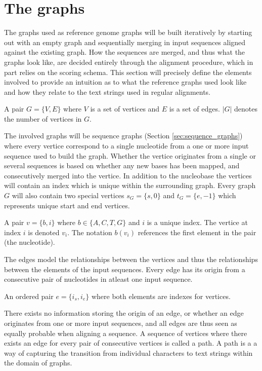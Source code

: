 \documentclass[thesis.tex]{subfiles}
\begin{document}
{\section{The graphs}
The graphs used as reference genome graphs will be built iteratively by starting out with an empty graph and sequentially merging in input sequences aligned against the existing graph. How the sequences are merged, and thus what the graphs look like, are decided entirely through the alignment procedure, which in part relies on the scoring schema. This section will precisely define the elements involved to provide an intuition as to what the reference graphs used look like and how they relate to the text strings used in regular alignments. 
\begin{defn}
  A pair $G=\{V,E\}$ where $V$ is a set of vertices and $E$ is a set of edges. $|G|$ denotes the number of vertices in $G$.
\end{defn}
The involved graphs will be sequence graphs (Section \ref{sec:sequence_graphs}) where every vertice correspond to a single nucleotide from a one or more input sequence used to build the graph. Whether the vertice originates from a single or several sequences is based on whether any new bases has been mapped, and consecutively merged into the vertice. In addition to the nucleobase the vertices will contain an index which is unique within the surrounding graph. Every graph $G$ will also contain two special vertices $s_G=\{s, 0\}$ and $t_G=\{e, -1\}$ which represents unique start and end vertices. 
\begin{defn}
  A pair $v=\{b, i\}$ where $b \in \{A, C, T, G\}$ and $i$ is a unique index. The vertice at index $i$ is denoted $v_i$. The notation $b(v_i)$ references the first element in the pair (the nucleotide).
\end{defn}
The edges model the relationships between the vertices and thus the relationships between the elements of the input sequences. Every edge has its origin from a consecutive pair of nucleotides in atleast one input sequence.
\begin{defn}
  An ordered pair $e=\{i_s, i_e\}$ where both elements are indexes for vertices. 
\end{defn}
There exists no information storing the origin of an edge, or whether an edge originates from one or more input sequences, and all edges are thus seen as equally probable when aligning a sequence. A sequence of vertices where there exists an edge for every pair of consecutive vertices is called a path. A path is a a way of capturing the transition from individual characters to text strings within the domain of graphs.
}
\end{document}
